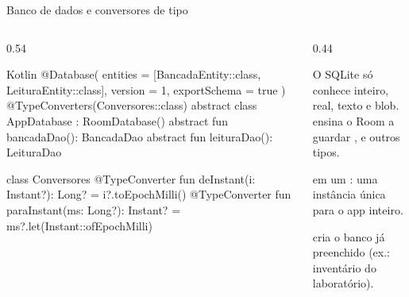 \documentclass[aspectratio=169,10pt]{beamer}
\begin{document}
\begin{frame}[fragile]{Banco de dados e conversores de tipo}
  \begin{columns}[T]
    \begin{column}{0.54\textwidth}
\begin{codigo}[title=AppDatabase.kt]{Kotlin}
@Database(
  entities = [BancadaEntity::class,
              LeituraEntity::class],
  version = 1,
  exportSchema = true
)
@TypeConverters(Conversores::class)
abstract class AppDatabase : RoomDatabase() {
  abstract fun bancadaDao(): BancadaDao
  abstract fun leituraDao(): LeituraDao
}

class Conversores {
  @TypeConverter
  fun deInstant(i: Instant?): Long? = i?.toEpochMilli()
  @TypeConverter
  fun paraInstant(ms: Long?): Instant? =
    ms?.let(Instant::ofEpochMilli)
}
\end{codigo}
    \end{column}
    \begin{column}{0.44\textwidth}
      \begin{conceito}[Conversores]
        O SQLite só conhece inteiro, real, texto e blob.  ensina o Room a guardar ,  e outros tipos.
      \end{conceito}
      \begin{dica}
         em um : uma instância única para o app inteiro.
      \end{dica}
      \begin{dica}
         cria o banco já preenchido (ex.: inventário do laboratório).
      \end{dica}
    \end{column}
  \end{columns}
\end{frame}
\end{document}
